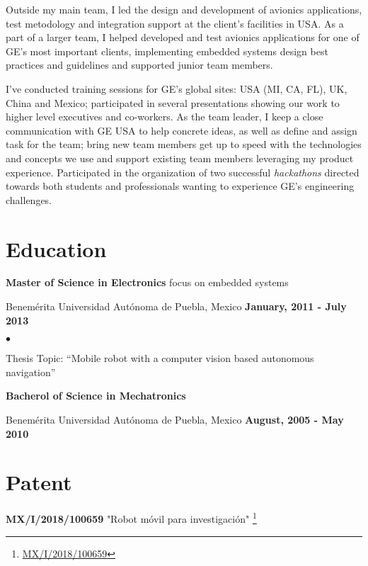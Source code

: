 \documentclass[margin,line]{res}
\newenvironment{list1}{
  \begin{list}{\ding{113}}{%
      \setlength{\itemsep}{0in}
      \setlength{\parsep}{0in} \setlength{\parskip}{0in}
      \setlength{\topsep}{0in} \setlength{\partopsep}{0in} 
      \setlength{\leftmargin}{0.17in}}}{\end{list}}
\newenvironment{list2}{
  \begin{list}{$\bullet$}{%
      \setlength{\itemsep}{0in}
      \setlength{\parsep}{0in} \setlength{\parskip}{0in}
      \setlength{\topsep}{0in} \setlength{\partopsep}{0in} 
      \setlength{\leftmargin}{0.2in}}}{\end{list}}
\begin{document}
\begin{resume}
Outside my main team, I led the design and development of avionics applications,
test metodology and integration support at the client's facilities in USA.
As a part of a larger team, I helped developed and test avionics applications for
one of GE's most important clients, implementing embedded systems design best
practices and guidelines and supported junior team members.

I've conducted training sessions for GE's global sites: USA (MI, CA, FL), UK, China and Mexico;
participated in several presentations showing our work to higher level
executives and co-workers. As the team leader, I keep a close communication with
GE USA to help concrete ideas, as well as define and assign task for the team;
bring new team members get up to speed with the technologies and concepts we use
and support existing team members leveraging my product experience.
Participated in the organization of two successful {\em hackathons} directed towards
both students and professionals wanting to experience GE's engineering challenges.

\section{\sc Education}
{\bf Master of Science in Electronics} focus on embedded systems \\
\vspace*{-.1in}
\begin{list1}
\item[] Benemérita Universidad Autónoma de Puebla, Mexico \hfill{\bf January, 2011 - July 2013}
\begin{list2}
\item Thesis Topic: ``Mobile robot with a computer vision based autonomous navigation''
\end{list2}
\end{list1}

{\bf Bacherol of Science in Mechatronics}   \\
\vspace*{-.1in}
\begin{list1}
\item[] Benemérita Universidad Autónoma de Puebla, Mexico \hfill{\bf August, 2005 - May 2010}
\end{list1}

\section{\sc Patent} 
{\bf MX/I/2018/100659} "Robot móvil para investigación" \footnote{ \href{https://drive.google.com/open?id=1DsnaAByaBixFv9GfyCH6JUAA95fj8aTY}{MX/I/2018/100659}}


\end{resume}
\end{document}
